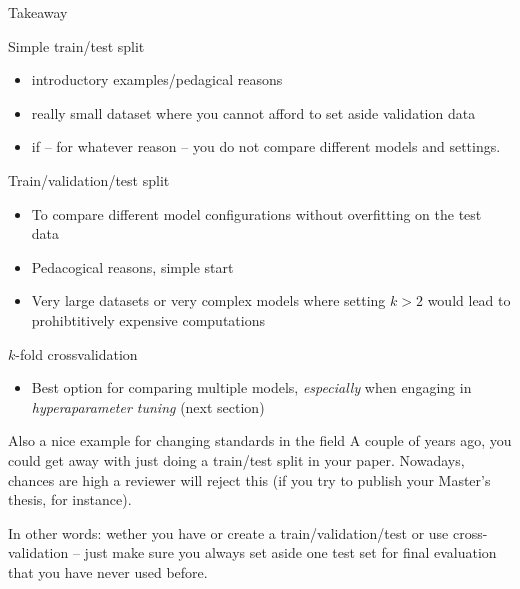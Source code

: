 \begin{frame}[allowframebreaks]{Takeaway}

\begin{block}{Simple train/test split}
\begin{itemize}
\item introductory examples/pedagical reasons
\item really small dataset where you cannot afford to set aside validation data
\item if -- for whatever reason -- you do not compare different models and settings.
\end{itemize}
\end{block}

\framebreak

\begin{block}{Train/validation/test split}
  \begin{itemize}
  \item To compare different model configurations without overfitting on the test data
  \item Pedacogical reasons, simple start
  \item Very large datasets or very complex models where setting $k>2$ would lead to prohibtitively expensive computations
  \end{itemize}
\end{block}

\framebreak

\begin{block}{$k$-fold crossvalidation}
  \begin{itemize}
  \item Best option for comparing multiple models, \emph{especially} when engaging in \emph{hyperaparameter tuning} (next section)
	\end{itemize}
\end{block}


\begin{alertblock}{Also a nice example for changing standards in the field}
A couple of years ago, you could get away with just doing a train/test split in your paper. Nowadays, chances are high a reviewer will reject this (if you try to publish your Master's thesis, for instance).
\end{alertblock}


\end{frame}



\begin{frame}[standout]
In other words: wether you have or create a train/validation/test or use cross-validation -- just make sure you always set aside one test set for final evaluation that you have never used before.
\end{frame}





